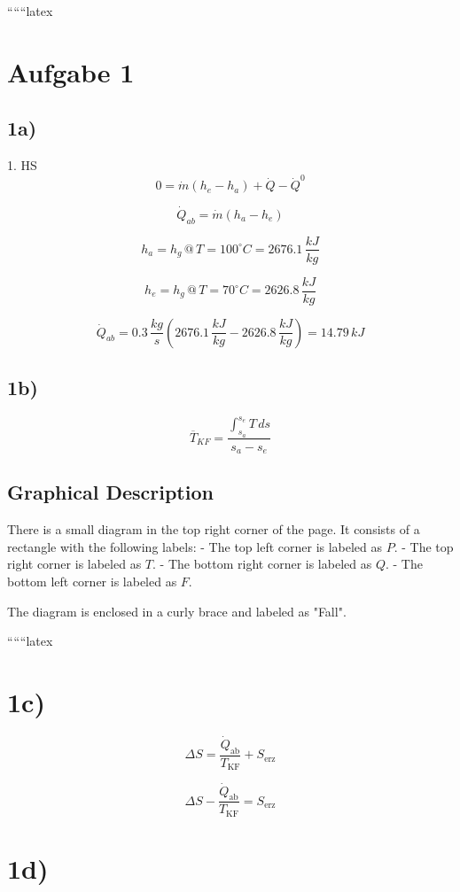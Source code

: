 
``````latex


\section*{Aufgabe 1}

\subsection*{1a)}
1. HS
\[
0 = \dot{m} (h_e - h_a) + \dot{Q} - \dot{Q}^0
\]

\[
\dot{Q}_{ab} = \dot{m} (h_a - h_e)
\]

\[
h_a = h_g \, @ \, T = 100^\circ C = 2676.1 \, \frac{kJ}{kg}
\]

\[
h_e = h_g \, @ \, T = 70^\circ C = 2626.8 \, \frac{kJ}{kg}
\]

\[
\dot{Q}_{ab} = 0.3 \, \frac{kg}{s} \left( 2676.1 \, \frac{kJ}{kg} - 2626.8 \, \frac{kJ}{kg} \right) = 14.79 \, kJ
\]

\subsection*{1b)}
\[
\overline{T}_{KF} = \frac{\int_{s_a}^{s_e} T \, ds}{s_a - s_e}
\]

\subsection*{Graphical Description}
There is a small diagram in the top right corner of the page. It consists of a rectangle with the following labels:
- The top left corner is labeled as $P$.
- The top right corner is labeled as $T$.
- The bottom right corner is labeled as $Q$.
- The bottom left corner is labeled as $F$.

The diagram is enclosed in a curly brace and labeled as "Fall".

``````latex


\section*{1c)}

\[
\Delta S = \frac{\dot{Q}_{\text{ab}}}{T_{\text{KF}}} + S_{\text{erz}}
\]

\[
\Delta S - \frac{\dot{Q}_{\text{ab}}}{T_{\text{KF}}} = S_{\text{erz}}
\]

\section*{1d)}

